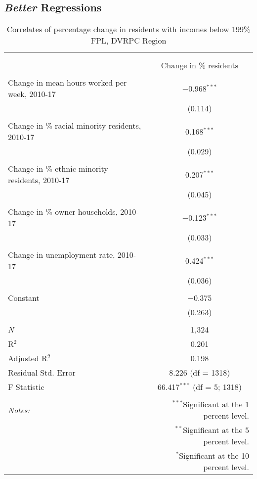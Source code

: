 \documentclass[paper=letterpaper, fontsize=11pt]{scrartcl}
\begin{document}
\subsection{\textit{Better} Regressions}
\begin{table}[!htbp] \centering 
	\caption{Correlates of percentage change in residents with incomes below 199\% FPL, DVRPC Region} 
		\label{} 
		\begin{tabular}{@{\extracolsep{5pt}}lc} 
			\\[-1.8ex]\hline 
			\hline \\[-1.8ex] 
			\\[-1.8ex] & Change in \% residents \\ 
			\hline \\[-1.8ex] 
			Change in mean hours worked per week, 2010-17 & $-$0.968$^{***}$ \\ 
			& (0.114) \\ 
			& \\ 
			Change in \% racial minority residents, 2010-17 & 0.168$^{***}$ \\ 
			& (0.029) \\ 
			& \\ 
			Change in \% ethnic minority residents, 2010-17 & 0.207$^{***}$ \\ 
			& (0.045) \\ 
			& \\ 
			Change in \% owner households, 2010-17 & $-$0.123$^{***}$ \\ 
			& (0.033) \\ 
			& \\ 
			Change in unemployment rate, 2010-17 & 0.424$^{***}$ \\ 
			& (0.036) \\ 
			& \\ 
			Constant & $-$0.375 \\ 
			& (0.263) \\ 
			& \\ 
			\textit{N} & 1,324 \\ 
			R$^{2}$ & 0.201 \\ 
			Adjusted R$^{2}$ & 0.198 \\ 
			Residual Std. Error & 8.226 (df = 1318) \\ 
			F Statistic & 66.417$^{***}$ (df = 5; 1318) \\ 
			\hline 
			\hline \\[-1.8ex] 
			\textit{Notes:} & \multicolumn{1}{r}{$^{***}$Significant at the 1 percent level.} \\ 
			& \multicolumn{1}{r}{$^{**}$Significant at the 5 percent level.} \\ 
			& \multicolumn{1}{r}{$^{*}$Significant at the 10 percent level.} \\ 
		\end{tabular} 
	\end{table}
\end{document}
